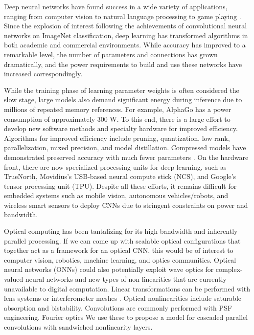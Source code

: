 Deep neural networks have found success in a wide variety of applications, ranging from computer vision to natural language processing to game playing \cite{lecun2015deep}. Since the explosion of interest following the achievements of convolutional neural networks on ImageNet classification, deep learning has transformed algorithms in both academic and commercial environments. While accuracy has improved to a remarkable level, the number of parameters and connections has grown dramatically, and the power requirements to build and use these networks have increased correspondingly. 

While the training phase of learning parameter weights is often considered the slow stage, large models also demand significant energy during inference due to millions of repeated memory references. For example, AlphaGo has a power consumption of approximately 300 W. To this end, there is a large effort to develop new software methods and specialty hardware for improved efficiency. Algorithms for improved efficiency include pruning, quantization, low rank, parallelization, mixed precision, and model distillation. Compressed models have demonstrated preserved accuracy with much fewer parameters \cite{han2015deep,iandola2016squeezenet}. On the hardware front, there are now specialized processing units for deep learning, such as TrueNorth, Movidius's USB-based neural compute stick (NCS), and Google's tensor processing unit (TPU). Despite all these efforts, it remains difficult for embedded systems such as mobile vision, autonomous vehicles/robots, and wireless smart sensors to deploy CNNs due to stringent constraints on power and bandwidth. 

Optical computing has been tantalizing for its high bandwidth and inherently parallel processing. If we can come up with scalable optical configurations that together act as a framework for an optical CNN, this would be of interest to computer vision, robotics, machine learning, and optics communities. Optical neural networks (ONNs) could also potentially exploit wave optics for complex-valued neural networks and new types of non-linearities that are currently unavailable to digital computation. Linear transformations can be performed with lens systems or interferometer meshes \cite{shen2017deep}. Optical nonlinearities include saturable absorption and bistability. Convolutions are commonly performed with PSF engineering.
Fourier optics
 We use these to propose a model for cascaded parallel convolutions with sandwiched nonlinearity layers.

